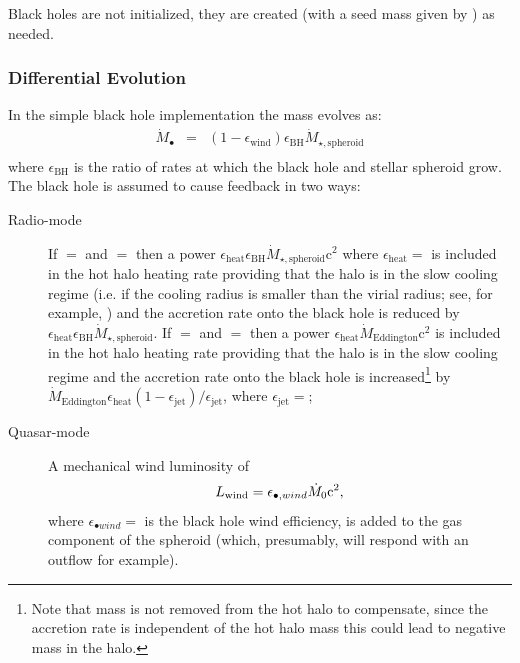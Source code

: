 Black holes are not initialized, they are created (with a seed mass given by ) as needed.

\subsubsection{Differential Evolution}

In the simple black hole implementation the mass evolves as:
\begin{eqnarray}
\dot{M}_\bullet &=& (1-\epsilon_\mathrm{wind}) \epsilon_\mathrm{BH} \dot{M}_{\star,\mathrm{spheroid}} \\
\end{eqnarray}
where $\epsilon_\mathrm{BH}$ is the ratio of rates at which the black hole and stellar spheroid grow. The black hole is assumed to cause feedback in two ways:
\begin{description}
 \item [Radio-mode] If \mono{[blackHoleHeatsHotHalo]}$=$ and \mono{[blackHoleAccretesFromHotHalo]}$=$ then a power $\epsilon_\mathrm{heat} \epsilon_\mathrm{BH} \dot{M}_{\star,\mathrm{spheroid}} \mathrm{c}^2$ where $\epsilon_\mathrm{heat}=$\mono{[blackHoleHeatingEfficiency]} is included in the hot halo heating rate providing that the halo is in the slow cooling regime (i.e. if the cooling radius is smaller than the virial radius; see, for example, \citealt{benson_cold_2010}) and the accretion rate onto the black hole is reduced by $\epsilon_\mathrm{heat} \epsilon_\mathrm{BH} \dot{M}_{\star,\mathrm{spheroid}}$. If \mono{[blackHoleHeatsHotHalo]}$=$ and \mono{[blackHoleAccretesFromHotHalo]}$=$ then a power $\epsilon_\mathrm{heat} \dot{M}_\mathrm{Eddington} \mathrm{c}^2$ is included in the hot halo heating rate providing that the halo is in the slow cooling regime and the accretion rate onto the black hole is increased\footnote{Note that mass is not removed from the hot halo to compensate, since the accretion rate is independent of the hot halo mass this could lead to negative mass in the halo.} by $\dot{M}_\mathrm{Eddington} \epsilon_\mathrm{heat} (1-\epsilon_\mathrm{jet})/\epsilon_\mathrm{jet}$, where $\epsilon_\mathrm{jet}=$\mono{[blackHoleJetEfficiency]};
 \item [Quasar-mode] A mechanical wind luminosity of \citep{ostriker_momentum_2010}
\begin{equation}
 L_\mathrm{wind} = \epsilon_{\bullet, wind} \dot{M}_0 \mathrm{c}^2,
\end{equation}
where $\epsilon_{\bullet wind}=$\mono{[blackHoleWindEfficiency]} is the black hole wind efficiency, is added to the gas \gls{component} of the spheroid (which, presumably, will respond with an outflow for example).
\end{description}

